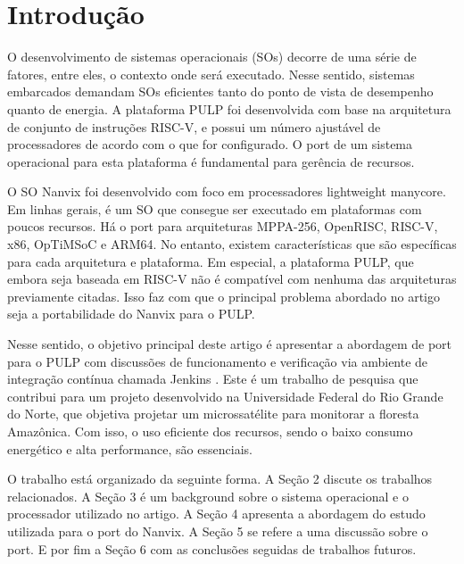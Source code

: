 \section{Introdução}

O desenvolvimento de sistemas operacionais (SOs) decorre de uma série de fatores, entre eles, o contexto onde será executado. Nesse sentido, sistemas
embarcados demandam SOs eficientes tanto do ponto de vista de desempenho quanto de energia. A plataforma PULP foi desenvolvida com base na arquitetura 
de conjunto de instruções RISC-V, e possui um número ajustável de processadores de acordo com o que for configurado. O port de um sistema operacional 
para esta plataforma é fundamental para gerência de recursos.

O SO Nanvix foi desenvolvido com foco em processadores lightweight manycore. Em linhas gerais, é um SO que consegue ser executado em plataformas com poucos
recursos. Há o port para arquiteturas MPPA-256, OpenRISC, RISC-V, x86, OpTiMSoC e ARM64. No entanto, existem características que são específicas para cada 
arquitetura e plataforma. Em especial, a plataforma PULP, que embora seja baseada em RISC-V não é compatível com nenhuma das arquiteturas previamente citadas. 
Isso faz com que o principal problema abordado no artigo seja a portabilidade do Nanvix para o PULP.

Nesse sentido, o objetivo principal deste artigo é apresentar a abordagem de port para o PULP com discussões de funcionamento e verificação via ambiente de integração contínua chamada
Jenkins \cite{JenkinsServer}. Este é um trabalho de pesquisa que contribui para um projeto desenvolvido na Universidade Federal do Rio Grande do Norte, que objetiva projetar
 um microssatélite para monitorar a floresta Amazônica. Com isso, o uso eficiente dos recursos, sendo o baixo consumo energético e alta performance, são essenciais.

O trabalho está organizado da seguinte forma. A Seção 2 discute os trabalhos relacionados. A Seção 3 é um background sobre o sistema operacional e o 
processador utilizado no artigo. A Seção 4 apresenta a abordagem do estudo utilizada para o port do Nanvix. A Seção 5 se refere a uma discussão sobre 
o port. E por fim a Seção 6 com as conclusões seguidas de trabalhos futuros.
